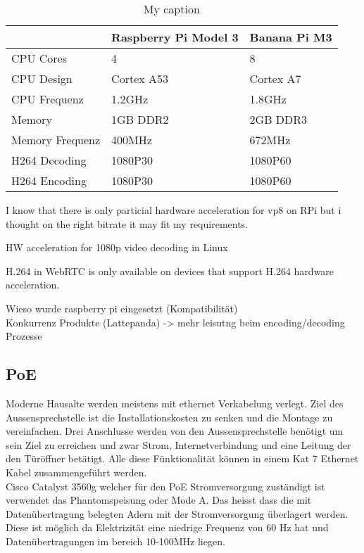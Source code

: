 \begin{table}[]     
	\centering
	\label{my-label}
	\begin{tabular}{l|ll}
		\multicolumn{1}{r|}{} & Raspberry Pi Model 3 & Banana Pi M3 \\ \hline
		CPU Cores             & 4                    & 8            \\ \hline
		CPU Design            & Cortex A53           & Cortex A7    \\ \hline
		CPU Frequenz          & 1.2GHz               & 1.8GHz       \\ \hline
		Memory                & 1GB DDR2             & 2GB DDR3     \\ \hline
		Memory Frequenz       & 400MHz               & 672MHz       \\ \hline
		H264 Decoding         & 1080P30              & 1080P60      \\ \hline
		H264 Encoding         & 1080P30              & 1080P60      \\ \hline
	\end{tabular}
\caption{My caption}
\label{tbl:Comaparison}
\end{table}




I know that there is only particial hardware acceleration for vp8 on RPi but i thought on the right bitrate
it may fit my requirements.

HW acceleration for 1080p video decoding in Linux

H.264 in WebRTC is only available on devices that support H.264 hardware acceleration.

Wieso wurde raspberry pi eingesetzt (Kompatibilität)
\\
Konkurrenz Produkte (Lattepanda) -> mehr leisutng beim encoding/decoding Prozesse
\\

\subsection{PoE}
\label{sec:poe}
Moderne Hausalte werden meistens mit ethernet Verkabelung verlegt. Ziel des Aussensprechstelle ist die Installationskosten zu senken und die Montage zu vereinfachen. Drei Anschlusse werden von den Aussensprechstelle benötigt um sein Ziel zu erreichen und zwar Strom, Internetverbindung und eine Leitung der den Türöffner betätigt. Alle diese Fünktionalität können in einem Kat 7 Ethernet Kabel zusammengeführt werden. 
\\
Cisco Catalyst 3560g welcher für den PoE Stromversorgung zuständigt ist verwendet das Phantomspeisung oder Mode A. Das heisst dass die mit Datenübertragung belegten Adern mit der Stromversorgung überlagert werden. Diese ist möglich da Elektrizität eine niedrige Frequenz von 60 Hz hat und Datenübertragungen im bereich 10-100MHz liegen.

